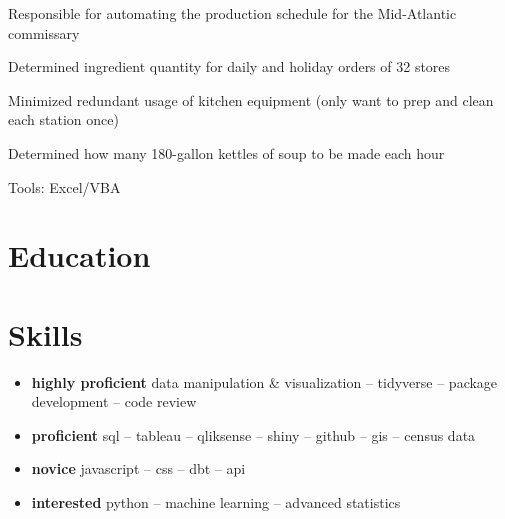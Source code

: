 \documentclass[11pt, a4paper]{awesome-cv}
\providecommand{\tightlist}{%
	\setlength{\itemsep}{0pt}\setlength{\parskip}{0pt}}
\begin{document}
\begin{cventries}
{\begin{cvitems}
\item Responsible for automating the production schedule for the Mid-Atlantic commissary
\item Determined ingredient quantity for daily and holiday orders of 32 stores
\item Minimized redundant usage of kitchen equipment (only want to prep and clean each station once)
\item Determined how many 180-gallon kettles of soup to be made each hour
\item Tools: Excel/VBA
\end{cvitems}}
\end{cventries}

\hypertarget{education}{%
\section{\texorpdfstring{
Education}{ Education}}\label{education}}

\begin{cventries}
    \vspace{-4.0mm}
\end{cventries}

\hypertarget{skills}{%
\section{\texorpdfstring{ Skills}{ Skills}}\label{skills}}

\begin{itemize}
\tightlist
\item
  \textbf{highly proficient} data manipulation \& visualization --
  tidyverse -- package development -- code review
\item
  \textbf{proficient} sql -- tableau -- qliksense -- shiny -- github --
  gis -- census data
\item
  \textbf{novice} javascript -- css -- dbt -- api
\item
  \textbf{interested} python -- machine learning -- advanced statistics
\end{itemize}
\end{document}
